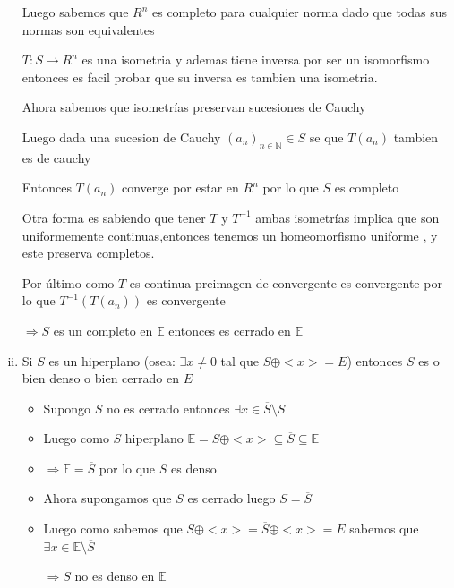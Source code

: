 \documentclass[12pt]{article}
\newcommand{\E}{\mathbb{E}}
\newcommand{\N}{\mathbb{N}}
\newcommand{\Ra}{\Rightarrow}
\newcommand{\ra}{\rightarrow}
\newcommand{\ol}{\overline}
\begin{document}
\begin{enumerate}[i.]
		Luego sabemos que $R^n$ es completo para cualquier norma dado que todas sus normas son equivalentes

		$T:S \ra R^n$ es una isometria y ademas tiene inversa por ser un isomorfismo entonces es facil probar que su inversa es tambien una isometria.

		Ahora sabemos que isometrías preservan sucesiones de Cauchy

		Luego dada una sucesion de Cauchy $(a_{n})_{n \in \N} \in S$ se que $T(a_{n})$ tambien es de cauchy

		Entonces $T(a_{n})$ converge por estar en $R^n$ por lo que $S$ es completo

		Otra forma es sabiendo que tener $T$ y $T^{-1}$ ambas isometrías implica que son uniformemente continuas,entonces tenemos un homeomorfismo uniforme , y este preserva completos.

		Por último como $T$ es continua preimagen de convergente es convergente por lo que $T^{-1}(T(a_{n}))$ es convergente

		$\Ra S$ es un completo en $\E$ entonces es cerrado en $\E$

	\item Si $S$ es un hiperplano (osea: $\exists x \neq 0$ tal que $ S
		\oplus <x> = E$) entonces $S$ es o bien denso o bien cerrado en
		$E$

		\begin{itemize}	
			\item Supongo $S$ no es cerrado entonces $\exists x \in \ol S \setminus S $

			\item Luego como $S$ hiperplano $\E = S \oplus <x> \subseteq \ol S \subseteq \E$

			\item $\Ra \E = \ol S$ por lo que $S$ es denso

			\item Ahora supongamos que $S$ es cerrado luego $S = \ol S$

			\item Luego como sabemos que $S \oplus <x> = \ol S \oplus <x> = E$ sabemos que $\exists x \in \E \setminus \ol S$
		
			$\Ra S $ no es denso en $\E$
		\end{itemize}

\end{enumerate}
\end{document}
